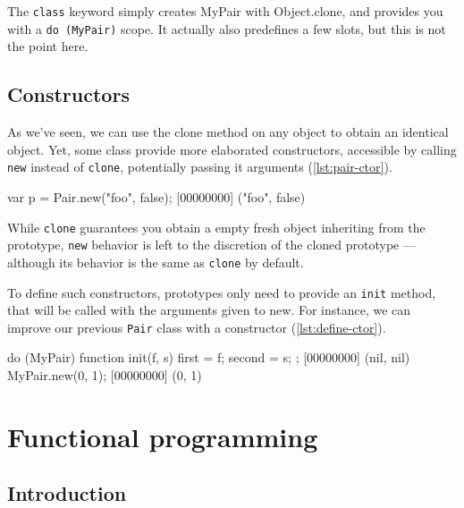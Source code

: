 The \texttt{class} keyword simply creates MyPair with Object.clone,
and provides you with a \lstinline|do (MyPair)| scope. It actually also
predefines a few slots, but this is not the point here.

\section{Constructors}
\label{sec:tut:ctor}
As we've seen, we can use the clone method on any object to obtain an
identical object. Yet, some class provide more elaborated
constructors, accessible by calling \texttt{new} instead of
\texttt{clone}, potentially passing it arguments (\autoref{lst:pair-ctor}).

\begin{urbiscript}[caption=Calling constructors with \texttt{new},
label=lst:pair-ctor]
var p = Pair.new("foo", false);
[00000000] ("foo", false)
\end{urbiscript}

While \texttt{clone} guarantees you obtain a empty fresh object
inheriting from the prototype, \texttt{new} behavior is left to the
discretion of the cloned prototype --- although its behavior is the
same as \texttt{clone} by default.

To define such constructors, prototypes only need to provide an
\texttt{init} method, that will be called with the arguments given to
new. For instance, we can improve our previous \texttt{Pair} class
with a constructor (\autoref{lst:define-ctor}).

\begin{urbiscript}[caption=Defining constructors,
  label=lst:define-ctor, name=my-pair]
do (MyPair)
{
  function init(f, s)
  {
    first = f;
    second = s;
  }
};
[00000000] (nil, nil)
MyPair.new(0, 1);
[00000000] (0, 1)
\end{urbiscript}


\chapter{Functional programming}
\label{section:functional}

\section{Introduction}

